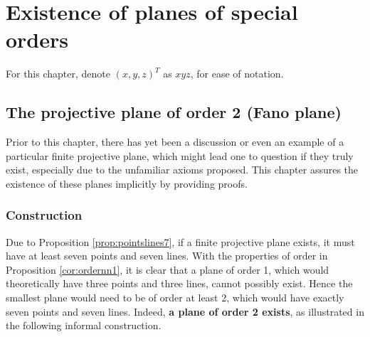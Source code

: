 \documentclass{report}
\theoremstyle{definition}\newtheorem*{definition}{Definition}
\theoremstyle{definition}\newtheorem*{example}{Example}
\theoremstyle{remark}\newtheorem*{remark}{Remark}
\begin{document}
\chapter{Existence of planes of special orders}

For this chapter, denote $ (x, y, z)^T $ as $ xyz $, for ease of notation.

\section{The projective plane of order 2 (Fano plane)}

Prior to this chapter, there has yet been a discussion or even an example of a particular finite projective plane, which might lead one to question if they truly exist, especially due to the unfamiliar axioms proposed. This chapter assures the existence of these planes implicitly by providing proofs.

\subsection{Construction}

Due to Proposition \ref{prop:pointslines7}, if a finite projective plane exists, it must have at least seven points and seven lines. With the properties of order in Proposition \ref{cor:ordernn1}, it is clear that a plane of order 1, which would theoretically have three points and three lines, cannot possibly exist. Hence the smallest plane would need to be of order at least 2, which would have exactly seven points and seven lines.
Indeed, \textbf{a plane of order 2 exists}, as illustrated in the following informal construction.
\end{document}
